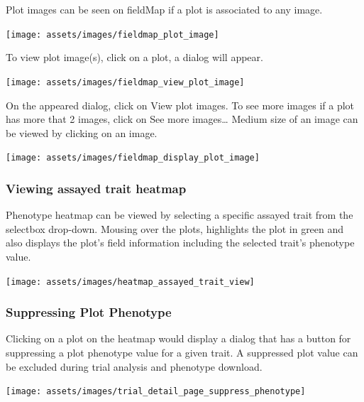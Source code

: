 \documentclass[
  12pt,
]{book}
\begin{document}
Plot images can be seen on fieldMap if a plot is associated to any image.

\begin{center}\texttt{[image: assets/images/fieldmap\_plot\_image]} \end{center}

To view plot image(s), click on a plot, a dialog will appear.

\begin{center}\texttt{[image: assets/images/fieldmap\_view\_plot\_image]} \end{center}

On the appeared dialog, click on View plot images. To see more images if a plot has more that 2 images, click on See more images\ldots{} Medium size of an image can be viewed by clicking on an image.

\begin{center}\texttt{[image: assets/images/fieldmap\_display\_plot\_image]} \end{center}

\hypertarget{viewing-assayed-trait-heatmap}{%
\subsubsection*{Viewing assayed trait heatmap}\label{viewing-assayed-trait-heatmap}}


Phenotype heatmap can be viewed by selecting a specific assayed trait from the selectbox drop-down. Mousing over the plots, highlights the plot in green and also displays the plot's field information including the selected trait's phenotype value.

\begin{center}\texttt{[image: assets/images/heatmap\_assayed\_trait\_view]} \end{center}

\hypertarget{suppressing-plot-phenotype}{%
\subsubsection*{Suppressing Plot Phenotype}\label{suppressing-plot-phenotype}}


Clicking on a plot on the heatmap would display a dialog that has a button for suppressing a plot phenotype value for a given trait. A suppressed plot value can be excluded during trial analysis and phenotype download.

\begin{center}\texttt{[image: assets/images/trial\_detail\_page\_suppress\_phenotype]} \end{center}
\end{document}
